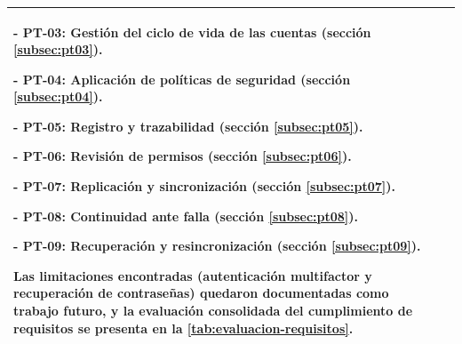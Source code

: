 \begin{table}[htbp]
\begin{tabular}{|>{\raggedright\arraybackslash}p{}|>{\raggedright\arraybackslash}p{}|}
		- \textbf{PT-03}: Gestión del ciclo de vida de las cuentas (sección \textcolor[HTML]{1B6B93}{\ref{subsec:pt03}}).\par
		- \textbf{PT-04}: Aplicación de políticas de seguridad (sección \textcolor[HTML]{1B6B93}{\ref{subsec:pt04}}).\par
		- \textbf{PT-05}: Registro y trazabilidad (sección \textcolor[HTML]{1B6B93}{\ref{subsec:pt05}}).\par
		- \textbf{PT-06}: Revisión de permisos (sección \textcolor[HTML]{1B6B93}{\ref{subsec:pt06}}).\par
		- \textbf{PT-07}: Replicación y sincronización (sección \textcolor[HTML]{1B6B93}{\ref{subsec:pt07}}).\par
		- \textbf{PT-08}: Continuidad ante falla (sección \textcolor[HTML]{1B6B93}{\ref{subsec:pt08}}).\par
		- \textbf{PT-09}: Recuperación y resincronización (sección \textcolor[HTML]{1B6B93}{\ref{subsec:pt09}}).\par\vspace{0.4em}
		Las limitaciones encontradas (autenticación multifactor y recuperación de contraseñas) quedaron documentadas como trabajo futuro, y la evaluación consolidada del cumplimiento de requisitos se presenta en la \autoref{tab:evaluacion-requisitos}.                                                                                                                                  \\
		\hline
	\end{tabular}
\end{table}
